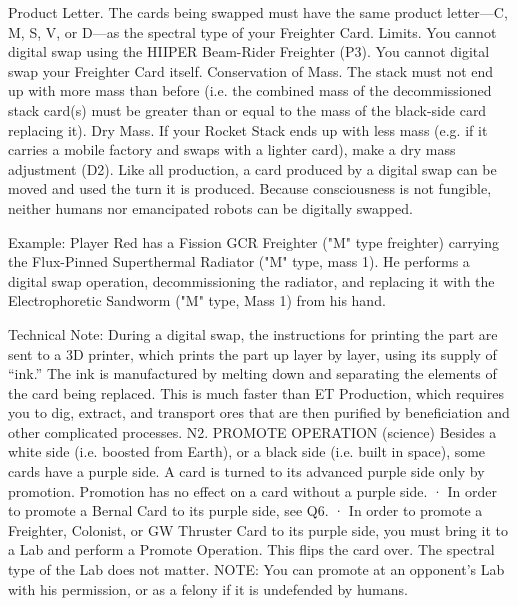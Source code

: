 \documentclass[a4paper]{book}
\begin{document}
Product Letter. The cards being swapped must have the same product letter—C, M, S, V, or D—as the spectral type of your Freighter Card.
Limits. You cannot digital swap using the HIIPER Beam-Rider Freighter (P3). You cannot digital swap your Freighter Card itself.
Conservation of Mass. The stack must not end up with more mass than before (i.e. the combined mass of the decommissioned stack card(s) must be greater than or equal to the mass of the black-side card replacing it).
Dry Mass. If your Rocket Stack ends up with less mass (e.g. if it carries a mobile factory and swaps with a lighter card), make a dry mass adjustment (D2).
Like all production, a card produced by a digital swap can be moved and used the turn it is produced.
Because consciousness is not fungible, neither humans nor emancipated robots can be digitally swapped.

Example: Player Red has a Fission GCR Freighter ("M" type freighter) carrying the Flux-Pinned Superthermal Radiator ("M" type, mass 1). He performs a digital swap operation, decommissioning the radiator, and replacing it with the Electrophoretic Sandworm ("M" type, Mass 1) from his hand.

Technical Note: During a digital swap, the instructions for printing the part are sent to a 3D printer, which prints the part up layer by layer, using its supply of “ink.” The ink is manufactured by melting down and separating the elements of the card being replaced. This is much faster than ET Production, which requires you to dig, extract, and transport ores that are then purified by beneficiation and other complicated processes.
N2. PROMOTE OPERATION (science)
Besides a white side (i.e. boosted from Earth), or a black side (i.e. built in space), some cards have a purple side. A card is turned to its advanced purple side only by promotion. Promotion has no effect on a card without a purple side.
·       In order to promote a Bernal Card to its purple side, see Q6.
·       In order to promote a Freighter, Colonist, or GW Thruster Card to its purple side, you must bring it to a Lab and perform a Promote Operation. This flips the card over. The spectral type of the Lab does not matter.
NOTE: You can promote at an opponent’s Lab with his permission, or as a felony if it is undefended by humans.
\end{document}

